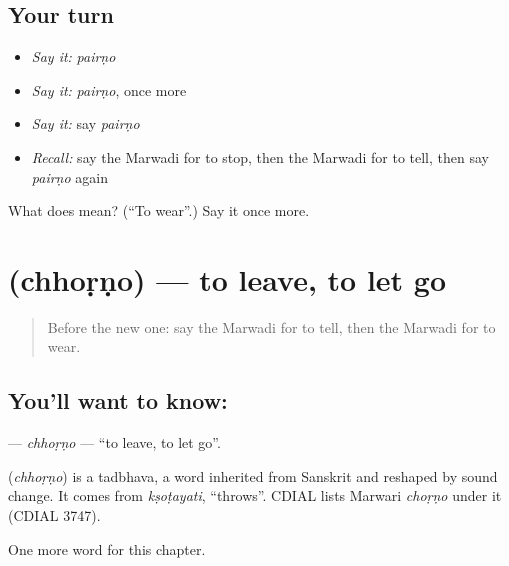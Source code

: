 \subsection*{Your turn}
\begin{itemize}
\raggedright
  \item \emph{Say it:} \emph{pairṇo}
  \item \emph{Say it:} \emph{pairṇo}, once more
  \item \emph{Say it:} say \emph{pairṇo}
  \item \emph{Recall:} say the Marwadi for to stop, then the Marwadi for to tell, then say \emph{pairṇo} again
\end{itemize}

\begin{tcolorbox}[breakable,colback=teal!4,colframe=teal!35!black,title={Before you move on}]
What does  mean? (\textquotedblleft{}To wear\textquotedblright{}.) Say it once more.
\end{tcolorbox}
\section[\texorpdfstring{\mw{छोड़णो} (chhoṛṇo)}{छोड़णो (chhoṛṇo)}]{ (chhoṛṇo) — to leave, to let go}

\label{lesson:MW-C57-chhorno}



\begin{quote}
Before the new one: say the Marwadi for to tell, then the Marwadi for to wear.
\end{quote}

\subsection*{You'll want to know: }
\textbf{} — \emph{chhoṛṇo} — \textquotedblleft{}to leave, to let go\textquotedblright{}.

\begin{cousinweb}
\textbf{} (\emph{chhoṛṇo}) is a tadbhava, a word inherited from Sanskrit and reshaped by sound change. It comes from \emph{kṣoṭayati}, \textquotedblleft{}throws\textquotedblright{}. CDIAL lists Marwari \emph{choṛṇo} under it (CDIAL 3747).
\end{cousinweb}

\begin{grammarlens}[title={What you've built}]
One more word for this chapter.
\end{grammarlens}

